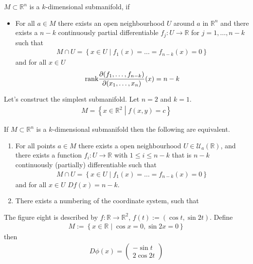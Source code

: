 \begin{definition}
    \(M \subset \mathbb{R}^n\) is a \(k\)-dimensional submanifold, if
    \begin{itemize}
        \item For all \(a \in M\) there exists an open neighbourhood \(U\) around \(a\) in \(\mathbb{R}^n\) and there exists a \(n - k\) continuously partial differentiable \(f_j : U \rightarrow \mathbb{R}\) for \(j = 1, \dots, n-k\) such that
        \begin{align}
            M \cap U = \left\{ x \in U \middle| f_1(x) = \dots = f_{n-k}(x) = 0 \right\}
        \end{align}
        and for all \(x \in U\)
        \begin{align}
            \text{rank} \frac{\partial (f_1, \dots, f_{n-k})}{\partial (x_1, \dots, x_n)}(x) = n-k
        \end{align}
    \end{itemize}
\end{definition}
%
\begin{example}
    Let's construct the simplest submanifold. Let \(n = 2\) and \(k = 1\).
    \begin{align}
        M = \left\{ x \in \mathbb{R}^2 \middle| f(x, y) = c \right\}
    \end{align}
\end{example}
%
\begin{theorem}
    If \(M \subset \mathbb{R}^n\) is a \(k\)-dimensional submanifold then the following are equivalent.
    \begin{enumerate}
        \item For all points \(a \in M\) there exists a open neighbourhood \(U \in \mathcal{U}_a(\mathbb{R})\), and there exists a function \(f_i: U \rightarrow \mathbb{R}\) with \(1 \leq i \leq n-k\) that is \(n-k\) continuously (partially) differentiable such that
        \begin{align}
            M \cap U = \left\{ x \in U \middle| f_1(x) = \dots = f_{n-k}(x) = 0 \right\}
        \end{align}
        and for all \(x \in U\) \(Df (x) = n-k\).
        \item There exists a numbering of the coordinate system, such that
    \end{enumerate}
\end{theorem}
%
\begin{example}
    The figure eight is described by \(f: \mathbb{R} \rightarrow \mathbb{R}^2\), \(f(t):= (\cos t, \sin 2t)\). Define
    \begin{align}
        M := \left\{ x \in \mathbb{R} \middle | \cos x = 0, \sin 2x = 0 \right\}
    \end{align}
    then
    \begin{align}
        D\phi(x) = \begin{pmatrix}
            -\sin t \\
            2\cos 2t
        \end{pmatrix}
    \end{align}
\end{example}
